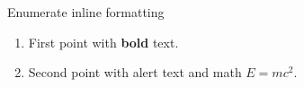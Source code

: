 \documentclass[14pt,t]{beamer-accessibility}
\begin{document}
\begin{frame}{Enumerate inline formatting}
\begin{enumerate}
\item First point with \textbf{bold} text.
\item Second point with \alert{alert} text and math $E = mc^2$.
\end{enumerate}
\end{frame}
\end{document}
